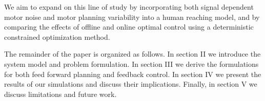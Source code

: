 \documentclass[letterpaper, 10pt, conference]{ieeeconf}
\newcommand{\todo}[1]{\textcolor{red}{\textbf{TODO:} #1}}
\begin{document}
We aim to expand on this line of study by incorporating both signal dependent motor noise and motor planning variability into a human reaching model, and by comparing the effects of offline and online optimal control using a deterministic constrained optimization method.

The remainder of the paper is organized as follows. In section II we introduce the system model and problem formulation. In section III we derive the formulations for both feed forward planning and feedback control. In section IV we present the results of our simulations and discuss their implications. Finally, in section V we discuss limitations and future work.






\end{document}
